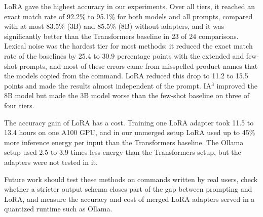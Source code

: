 \documentclass[journal,article,submit,pdftex,moreauthors]{Definitions/mdpi}
\begin{document}
LoRA gave the highest accuracy in our experiments. Over all tiers, it reached an exact match rate of 92.2\% to 95.1\% for both models and all prompts, compared with at most 83.5\% (3B) and 85.5\% (8B) without adapters, and it was significantly better than the Transformers baseline in 23 of 24 comparisons. Lexical noise was the hardest tier for most methods: it reduced the exact match rate of the baselines by 25.4 to 30.9 percentage points with the extended and few-shot prompts, and most of these errors came from misspelled product names that the models copied from the command. LoRA reduced this drop to 11.2 to 15.5 points and made the results almost independent of the prompt. IA$^3$ improved the 8B model but made the 3B model worse than the few-shot baseline on three of four tiers.

The accuracy gain of LoRA has a cost. Training one LoRA adapter took 11.5 to 13.4 hours on one A100 GPU, and in our unmerged setup LoRA used up to 45\% more inference energy per input than the Transformers baseline. The Ollama setup used 2.5 to 3.9 times less energy than the Transformers setup, but the adapters were not tested in it.

Future work should test these methods on commands written by real users, check whether a stricter output schema closes part of the gap between prompting and LoRA, and measure the accuracy and cost of merged LoRA adapters served in a quantized runtime such as Ollama.

\vspace{6pt} 



\end{document}
